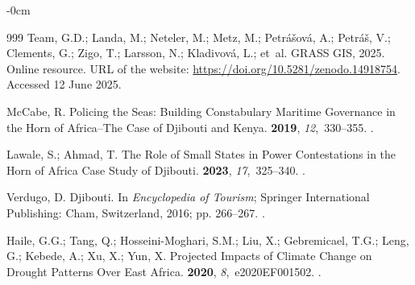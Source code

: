 \documentclass[jimaging,article,accept,pdftex,moreauthors]{Definitions/mdpi}
\begin{document}
\begin{adjustwidth}{-\extralength}{0cm}
\begin{thebibliography}{999}
Team, G.D.; Landa, M.; Neteler, M.; Metz, M.; Petr{\'a}{\v s}ov{\'a}, A.;
  Petr{\'a}{\v s}, V.; Clements, G.; Zigo, T.; Larsson, N.; Kladivov{\'a}, L.;
  et~al.
\newblock GRASS GIS, 2025. Online resource. URL of the website: \url{https://doi.org/10.5281/zenodo.14918754}. Accessed 12 June 2025. %

McCabe, R.
\newblock Policing the Seas: Building Constabulary Maritime Governance in the
  Horn of Africa–The Case of Djibouti and Kenya.
 {\bf 2019}, {\em 12},~330--355.
.

Lawale, S.; Ahmad, T.
\newblock The Role of Small States in Power Contestations in the Horn of Africa
  Case Study of Djibouti.
 {\bf 2023},
  {\em 17},~325--340.
.

Verdugo, D. Djibouti.
\newblock In {\em Encyclopedia of Tourism}; Springer International Publishing:
  Cham,  Switzerland, 2016; pp. 266--267.
.

Haile, G.G.; Tang, Q.; Hosseini-Moghari, S.M.; Liu, X.; Gebremicael, T.G.;
  Leng, G.; Kebede, A.; Xu, X.; Yun, X.
\newblock Projected Impacts of Climate Change on Drought Patterns Over East
  Africa.
 {\bf 2020}, {\em 8},~e2020EF001502.
.


\end{thebibliography}
\end{adjustwidth}
\end{document}
